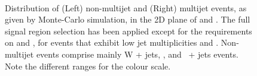 \begin{figure}[!h]
  \centering
   \\
  \caption{Distribution of (Left) non-multijet and (Right) multijet
    events, as given by Monte-Carlo simulation, in the 2D plane of
    \mhtmet and \alphat. The full signal region selection has been
    applied except for the requirements on \mhtmet and \alphat, for
    events that exhibit low jet multiplicities and
    \scalht. Non-multijet events comprise mainly W + jets, \ttbar, and
    \znunu\ + jets events. Note the different ranges for the colour
    scale.}
  \label{fig:qcd-2d-sim}
\end{figure}

